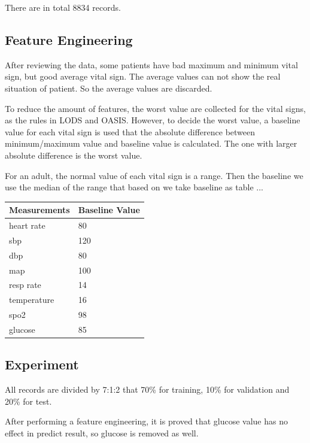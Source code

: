 \documentclass[12pt,a4paper,english
]{tunithesis}
\begin{document}
There are in total 8834 records. 

\subsection{Feature Engineering}
After reviewing the data, some patients have bad maximum and minimum vital sign, but good average vital sign. The average values can not show the real situation of patient. So the average values are discarded.

To reduce the amount of features, the worst value are collected for the vital signs, as the rules in LODS and OASIS. However, to decide the worst value, a baseline value for each vital sign is used that the absolute difference between minimum/maximum value and baseline value is calculated. The one with larger absolute difference is the worst value. 

For an adult, the normal value of each vital sign is a range. Then the baseline we use the median of the range that based on  we take baseline as table  ...
\begin{table}[]
\begin{tabular}{|l|l|}
\hline
\textbf{Measurements} & \textbf{Baseline Value}\\ \hline
heart rate            & 80                \\ \hline
sbp                   & 120               \\ \hline
dbp                   & 80                \\ \hline
map                   & 100               \\ \hline
resp rate             & 14                \\ \hline
temperature           & 16                \\ \hline
spo2                  & 98                \\ \hline
glucose               & 85                \\ \hline
\end{tabular}
\end{table}

\subsection{Experiment}

All records are divided by 7:1:2 that 70\% for training, 10\% for validation and 20\% for test. 

After performing a feature engineering, it is proved that glucose value has no effect in predict result, so glucose is removed as well.
\end{document}
